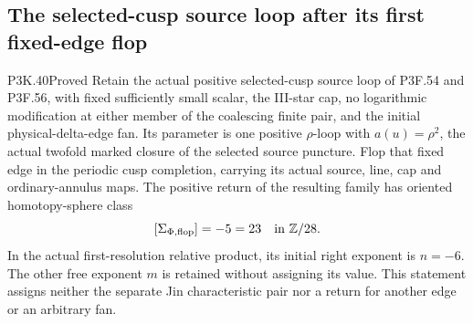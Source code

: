 \subsection{The selected-cusp source loop after its first fixed-edge flop}
\begin{statement}{P3K.40}{Proved}
Retain the actual positive selected-cusp source loop of P3F.54 and
P3F.56, with fixed sufficiently small scalar, the III-star cap, no
logarithmic modification at either member of the coalescing finite
pair, and the initial physical-delta-edge fan. Its parameter is one
positive \(\rho\)-loop with \(a(u)=\rho^2\), the actual twofold
marked closure of the selected source puncture. Flop that fixed edge
in the periodic cusp completion, carrying its actual source, line,
cap and ordinary-annulus maps. The positive return of the resulting
family has oriented homotopy-sphere class
\[
                 [\Sigma_{\Phi,\mathrm{flop}}]
                     =-5=23\quad\hbox{in }\mathbb Z/28.
\]
In the actual first-resolution relative product, its initial right
exponent is \(n=-6\). The other free exponent \(m\) is retained
without assigning its value. This statement assigns neither the
separate Jin characteristic pair nor a return for another edge or
an arbitrary fan.
\end{statement}
